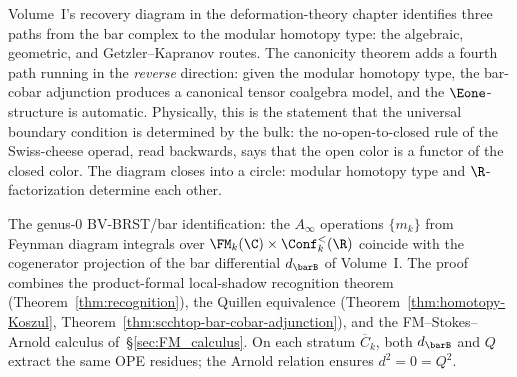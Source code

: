 \begin{remark}
\label{rem:boundary-path}
Volume~I's recovery diagram in the deformation-theory chapter identifies three
paths from the bar complex to the modular homotopy type:
the algebraic, geometric, and Getzler--Kapranov routes.
The canonicity theorem adds a fourth path running in the
\emph{reverse} direction: given the modular homotopy type,
the bar-cobar adjunction produces a canonical tensor
coalgebra model, and the $\Eone$-structure is automatic.
Physically, this is the statement that the universal
boundary condition is determined by the bulk: the
no-open-to-closed rule of the Swiss-cheese operad, read
backwards, says that the open color is a functor of
the closed color. The diagram closes into a circle:
modular homotopy type and $\R$-factorization determine
each other.
\end{remark}

\begin{remark}
\label{rem:mc5-bridge-pointer}%
\label{rem:mc5-genus-zero-bridge}%
The genus-$0$ BV-BRST/bar
identification: the $A_\infty$ operations $\{m_k\}$ from Feynman
diagram integrals over $\FM_k(\C) \times \Conf_k^{<}(\R)$
coincide with the cogenerator projection of the bar differential
$d_{\barB}$ of Volume~I. The proof combines the product-formal
local-shadow recognition theorem (Theorem~\ref{thm:recognition}),
the Quillen equivalence
(Theorem~\ref{thm:homotopy-Koszul},
Theorem~\ref{thm:scchtop-bar-cobar-adjunction}), and the FM--Stokes--Arnold
calculus of~\S\ref{sec:FM_calculus}. On each stratum
$\overline{C}_k$, both $d_{\barB}$ and $Q$ extract the same
OPE residues; the Arnold relation ensures $d^2 = 0 = Q^2$.
\end{remark}

